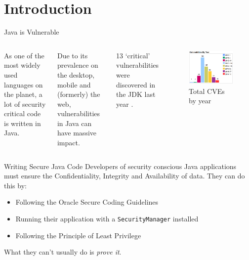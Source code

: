 \section{Introduction}

\begin{frame}{Java is Vulnerable}
	\begin{columns}
			As one of the most widely used languages on the planet, a lot of security critical code is written in Java.\newline
		
			Due to its prevalence on the desktop, mobile and (formerly) the web, vulnerabilities in Java can have massive impact.\newline
			
			13 `critical' vulnerabilities were discovered in the JDK last year \cite{nvd:jdk2016cvss9}.
		\begin{figure}
			\includegraphics[scale=0.25]{content/images/cvedetails_vulnsperyear.png}
			\caption{Total CVEs by year \cite{cvedetails:jdk2016}}
		\end{figure}
	\end{columns}	
\end{frame}

\begin{frame}{Writing Secure Java Code}
	Developers of security conscious Java applications must ensure the Confidentiality, Integrity and Availability of data. They can do this by:
	
	\begin{itemize}
		\item Following the Oracle Secure Coding Guidelines
		\item Running their application with a \texttt{SecurityManager} installed
		\item Following the Principle of Least Privilege
	\end{itemize}
	
	What they can't usually do is \textit{prove it}.
\end{frame}

